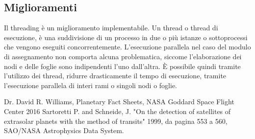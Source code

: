 \documentclass[a4paper,12pt]{report}
\begin{document}
\subsection{Miglioramenti}
Il threading è un miglioramento implementabile. Un thread o thread di esecuzione, è una suddivisione di un processo in due o più istanze o sottoprocessi che vengono eseguiti concorrentemente. L'esecuzione parallela nel caso del modulo di assegnamento non comporta alcuna problematica, siccome l'elaborazione dei nodi e delle foglie sono indipendenti l'uno dall'altra. È possibile quindi tramite l'utilizzo dei thread, ridurre drasticamente il tempo di esecuzione, tramite l'esecuzione parallela di interi rami o singoli nodi o foglie.



%
%
\begin{thebibliography}{00}

Dr. David R. Williams, Planetary Fact Sheets, NASA Goddard Space Flight Center 2016
%
Sartoretti P. and Schneide, J. "On the detection of satellites of extrasolar planets with the method of transits" 1999, da pagina 553 a 560, SAO/NASA Astrophysics Data System.

\end{thebibliography}

%
\end{document}
